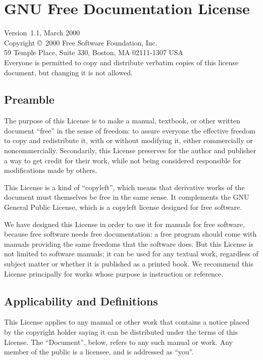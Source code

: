\documentclass[11pt,a4paper,oneside]{article}
\begin{document}

\section{GNU Free Documentation License}
\label{sec:gnu-free-doc-license}

Version~1.1, March 2000\\
 [0.25\baselineskip] Copyright \copyright\
2000 Free Software Foundation, Inc.\\
 [0.25\baselineskip] 59 Temple
Place, Suite 330, Boston, MA 02111-1307 USA\\
 Everyone is permitted to copy and distribute verbatim copies of this
license document, but changing it is not allowed.


\subsection*{Preamble}

The purpose of this License is to make a manual, textbook, or other
written document ``free'' in the sense of freedom: to assure everyone
the effective freedom to copy and redistribute it, with or without
modifying it, either commercially or noncommercially.  Secondarily, this
License preserves for the author and publisher a way to get credit for
their work, while not being considered responsible for modifications
made by others.

This License is a kind of ``copyleft'', which means that derivative
works of the document must themselves be free in the same sense.  It
complements the GNU General Public License, which is a copyleft license
designed for free software.

We have designed this License in order to use it for manuals for free
software, because free software needs free documentation: a free program
should come with manuals providing the same freedoms that the software
does.  But this License is not limited to software manuals; it can be
used for any textual work, regardless of subject matter or whether it is
published as a printed book.  We recommend this License principally for
works whose purpose is instruction or reference.


\subsection{Applicability and Definitions}
\label{sec:gnu-free-doc-license:appl-defin}

This License applies to any manual or other work that contains a notice
placed by the copyright holder saying it can be distributed under the
terms of this License.  The ``Document'', below, refers to any such
manual or work.  Any member of the public is a licensee, and is
addressed as ``you''.
\end{document}
